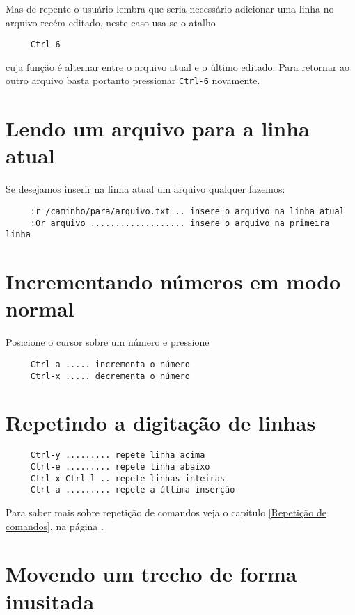 Mas de repente o usuário lembra que seria necessário adicionar uma linha no
arquivo recém editado, neste caso usa-se o atalho

\begin{verbatim}
     Ctrl-6
\end{verbatim}

cuja função é alternar entre o arquivo atual e o último editado. Para retornar
ao outro arquivo basta portanto pressionar \verb|Ctrl-6| novamente.

\section{Lendo um arquivo para a linha atual}
\label{sec:Lendo um arquivo para a linha atual}

Se desejamos inserir na linha atual um arquivo qualquer fazemos:

\begin{verbatim}
	 :r /caminho/para/arquivo.txt .. insere o arquivo na linha atual
	 :0r arquivo ................... insere o arquivo na primeira linha
\end{verbatim}


\section{Incrementando números em modo normal}\label{Incrementando números em modo normal}
Posicione o cursor sobre um número e pressione

\begin{verbatim}
     Ctrl-a ..... incrementa o número
     Ctrl-x ..... decrementa o número
\end{verbatim}

\section{Repetindo a digitação de linhas}
\label{Repetindo a digitação de linhas}

\begin{verbatim}
     Ctrl-y ......... repete linha acima
     Ctrl-e ......... repete linha abaixo
     Ctrl-x Ctrl-l .. repete linhas inteiras
     Ctrl-a ......... repete a última inserção
\end{verbatim}

Para saber mais sobre repetição de comandos veja o capítulo \ref{Repetição de comandos},
na página \pageref{Repetição de comandos}.

\section{Movendo um trecho de forma inusitada}
\label{Movendo um trecho de forma inusitada}

